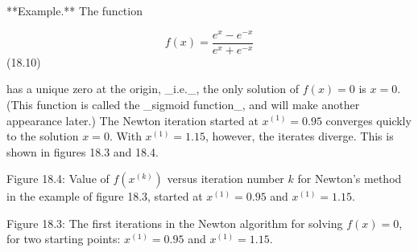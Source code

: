 

**Example.** The function

\[f(x)=\frac{e^{x}-e^{-x}}{e^{x}+e^{-x}}\] (18.10)

has a unique zero at the origin, _i.e._, the only solution of \(f(x)=0\) is \(x=0\). (This function is called the _sigmoid function_, and will make another appearance later.) The Newton iteration started at \(x^{(1)}=0.95\) converges quickly to the solution \(x=0\). With \(x^{(1)}=1.15\), however, the iterates diverge. This is shown in figures 18.3 and 18.4.

Figure 18.4: Value of \(f(x^{(k)})\) versus iteration number \(k\) for Newton’s method in the example of figure 18.3, started at \(x^{(1)}=0.95\) and \(x^{(1)}=1.15\).

Figure 18.3: The first iterations in the Newton algorithm for solving \(f(x)=0\), for two starting points: \(x^{(1)}=0.95\) and \(x^{(1)}=1.15\).

